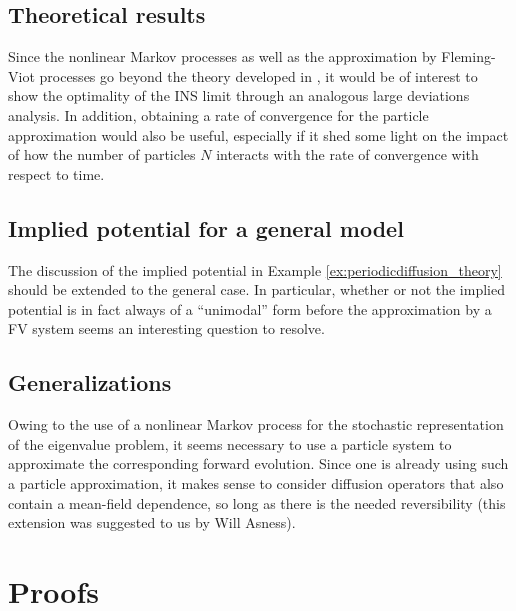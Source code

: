 \documentclass[english,11pt]{article}%
\numberwithin{equation}{section}
\numberwithin{example}{section}
\numberwithin{theorem}{section}
\begin{document}
\subsection{Theoretical results}
Since the nonlinear Markov processes as well as the approximation by Fleming-Viot processes go beyond the theory developed in \cite{dupliupladol},
it would be of interest to show the optimality of the INS limit through an analogous large deviations analysis. 
In addition, 
obtaining a rate of convergence for the particle approximation 
would also be useful,
especially if it shed some light on the impact of how the number of particles $N$
interacts with the rate of convergence with respect to time.
 

\subsection{Implied potential for a general model}
The discussion of the implied potential in Example \ref{ex:periodicdiffusion_theory}
should be extended to the general case.
In particular, whether or not the implied potential is in fact always of a ``unimodal'' form before the approximation by a FV system seems an interesting question to resolve. 

\subsection{Generalizations}
Owing to the use of a nonlinear Markov process for the stochastic representation of the eigenvalue problem, it seems necessary to use a particle system to approximate the corresponding forward evolution.
Since one is already using such a particle approximation,
it makes sense to consider diffusion operators that also contain a mean-field dependence,
so long as there is the needed reversibility (this extension was suggested to us by Will Asness).


\appendix

\section{Proofs}
\end{document}
